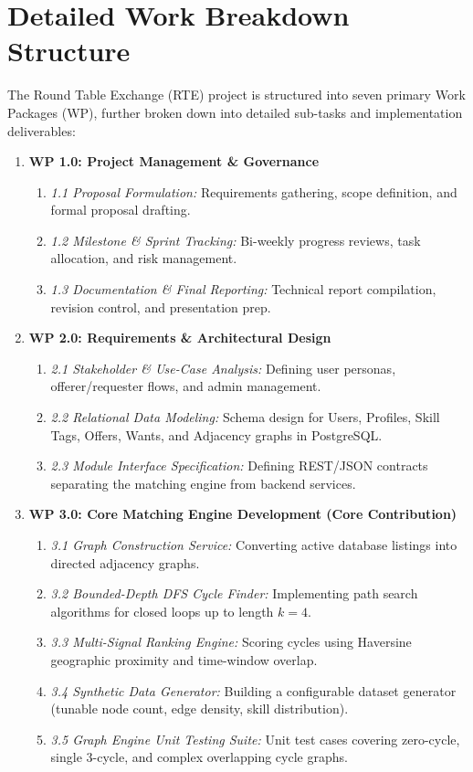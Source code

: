 \section{Detailed Work Breakdown Structure}

The Round Table Exchange (RTE) project is structured into seven primary Work Packages (WP), further broken down into detailed sub-tasks and implementation deliverables:

\begin{enumerate}
    \item \textbf{WP 1.0: Project Management \& Governance}
    \begin{enumerate}
        \item \textit{1.1 Proposal Formulation:} Requirements gathering, scope definition, and formal proposal drafting.
        \item \textit{1.2 Milestone \& Sprint Tracking:} Bi-weekly progress reviews, task allocation, and risk management.
        \item \textit{1.3 Documentation \& Final Reporting:} Technical report compilation, revision control, and presentation prep.
    \end{enumerate}

    \item \textbf{WP 2.0: Requirements \& Architectural Design}
    \begin{enumerate}
        \item \textit{2.1 Stakeholder \& Use-Case Analysis:} Defining user personas, offerer/requester flows, and admin management.
        \item \textit{2.2 Relational Data Modeling:} Schema design for Users, Profiles, Skill Tags, Offers, Wants, and Adjacency graphs in PostgreSQL.
        \item \textit{2.3 Module Interface Specification:} Defining REST/JSON contracts separating the matching engine from backend services.
    \end{enumerate}

    \item \textbf{WP 3.0: Core Matching Engine Development (Core Contribution)}
    \begin{enumerate}
        \item \textit{3.1 Graph Construction Service:} Converting active database listings into directed adjacency graphs.
        \item \textit{3.2 Bounded-Depth DFS Cycle Finder:} Implementing path search algorithms for closed loops up to length $k=4$.
        \item \textit{3.3 Multi-Signal Ranking Engine:} Scoring cycles using Haversine geographic proximity and time-window overlap.
        \item \textit{3.4 Synthetic Data Generator:} Building a configurable dataset generator (tunable node count, edge density, skill distribution).
        \item \textit{3.5 Graph Engine Unit Testing Suite:} Unit test cases covering zero-cycle, single 3-cycle, and complex overlapping cycle graphs.
    \end{enumerate}


\end{enumerate}
